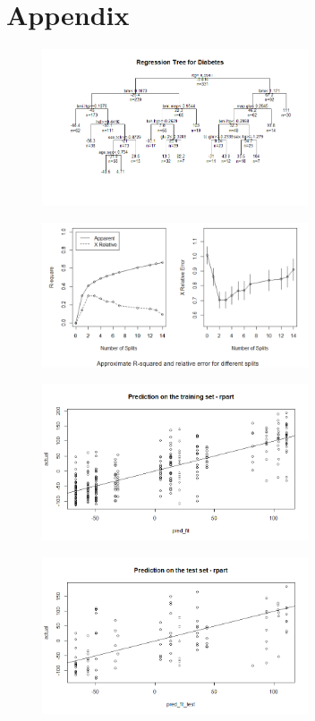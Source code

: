 \documentclass{usiinftr}
\begin{document}
\clearpage



\clearpage
\section{Appendix}

\begin{figure}[h!] 
\centering
\includegraphics[width=0.7\textwidth]{images/image119.png}
\end{figure}

\begin{figure}[h!] 
\centering
\includegraphics[width=0.7\textwidth]{images/image126.png}
\end{figure}

\begin{figure}[h!] 
\centering
\includegraphics[width=0.7\textwidth]{images/image108.png}
\end{figure}


\begin{figure}[h!] 
\centering
\includegraphics[width=0.7\textwidth]{images/image117.png}
\end{figure}
\end{document}
